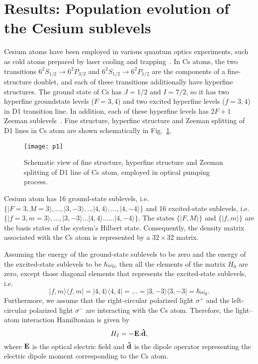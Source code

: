 \documentclass[a4paper]{article}
\begin{document}
\section{Results: Population evolution of the Cesium sublevels }\label{sec3}

Cesium atoms have been employed in  various quantum optics experiments, such as cold atoms prepared by laser cooling and trapping~\cite{r22,r21}. In Cs atoms, the two transitions $6 ^2 S_{1/2}\rightarrow 6 ^2 P_{3/2} $ and $6 ^2 S_{1/2}\rightarrow 6 ^2 P_{1/2} $ are the components of a fine-structure doublet, and each of these transitions additionally have hyperfine structures. The ground state of Cs has $J=1/2$ and $I=7/2$, so it has two hyperfine groundstate levels ($F=3,4$) and two excited hyperfine levels ($f=3,4$) in D1 transition line. In addition, each of these hyperfine levels has $2F+1 $ Zeeman sublevels~\cite{r23}. Fine structure, hyperfine structure and Zeeman splitting of D1 lines in Cs atom are shown schematically in Fig.~\ref{f1}. 
\begin{figure}[h!]
\centering
\texttt{[image: p1]}
\caption{Schematic view of fine structure, hyperfine structure and Zeeman splitting of D1 line of Cs atom, employed in  optical pumping
process.}\label{f1}
\end{figure}

Cesium atom has 16 ground-state sublevels, i.e.~$\{|F=3,M=3\rangle, \ldots, |3,-3\rangle, \ldots|4,4\rangle, \ldots, |4,-4\rangle\}$ and 16 excited-state sublevels, i.e.~$\{|f=3,m=3\rangle, \ldots, |3,-3\rangle\ldots|4,4\rangle ...\ldots |4,-4\rangle\}$.  The states $\{|F,M\rangle\}$ and $\{|f,m\rangle\}$ are the basis states of the system's Hilbert state. Consequently, the density matrix associated with the Cs atom is represented by a $32\times 32$ matrix.

Assuming the energy of the ground-state sublevels to be zero and the energy of the excited-state sublevels to be $\hbar\omega_0$, then all the elements of the matrix $H_0$ are zero, except those diagonal elements that represents the excited-state sublevels, i.e.
\begin{equation}
|f,m\rangle \langle f,m|=|4,4\rangle \langle 4,4|= \ldots=|3,-3\rangle \langle 3,-3| =\hbar\omega_0.
\end{equation}
Furthermore, we assume that the right-circular polarized light $\sigma^+ $ and the left-circular polarized light $\sigma^- $ are interacting with the Cs atom. Therefore, the light–atom interaction Hamiltonian is given  by
\begin{equation}
H_I =-\bf{E}.\bf{\hat d},
\end{equation}
where $\bf{E}$ is the optical electric field and  $\bf{\hat d}$ is the dipole operator representing the electric dipole moment corresponding to the Cs atom.
\end{document}
